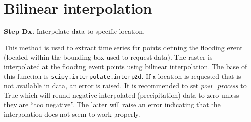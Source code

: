\documentclass[10pt,a4paper,titlepage,parskip]{scrartcl}
\begin{document}
\clearpage

\section{Bilinear interpolation}

\textbf{Step Dx:} Interpolate data to specific location.

This method is used to extract time series for points defining the flooding event (located within the bounding box used to request data). The raster is interpolated at the flooding event points using bilinear interpolation. The base of this function is \texttt{scipy.interpolate.interp2d}. If a location is requested that is not available in data, an error is raised. It is recommended to set \textit{post\_process} to True which will round negative interpolated (precipitation) data to zero unless they are ``too negative''. The latter will raise an error indicating that the interpolation does not seem to work properly.
\end{document}
